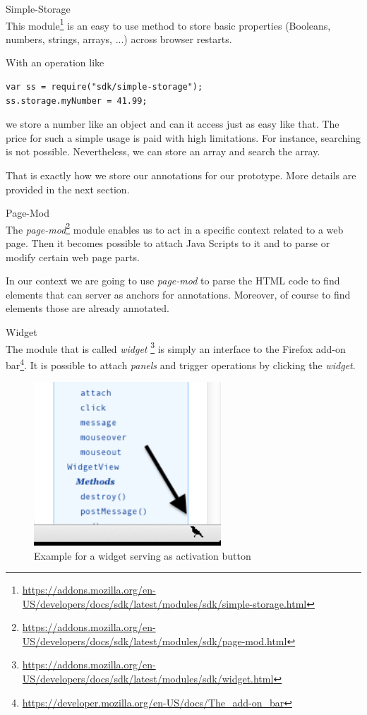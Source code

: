 \begin{description}
\item Simple-Storage\\
This module\footnote{\url{https://addons.mozilla.org/en-US/developers/docs/sdk/latest/modules/sdk/simple-storage.html}} is an easy to use method to store basic properties (Booleans, numbers, strings, arrays, ...) across browser restarts. 

With an operation like

\begin{lstlisting}
var ss = require("sdk/simple-storage");
ss.storage.myNumber = 41.99;
\end{lstlisting}

we store a number like an object and can it access just as easy like that. The price for such a simple usage is paid with high limitations. For instance, searching is not possible. Nevertheless, we can store an array and search the array. 

That is exactly how we store our annotations for our prototype. More details are provided in the next section.

\item Page-Mod\\
The \emph{page-mod}\footnote{\url{https://addons.mozilla.org/en-US/developers/docs/sdk/latest/modules/sdk/page-mod.html}} module enables us to act in a specific context related to a web page. Then it becomes possible to attach Java Scripts to it and to parse or modify certain web page parts.

In our context we are going to use \emph{page-mod} to parse the HTML code to find elements that can server as anchors for annotations. Moreover, of course to find elements those are already annotated.

\item Widget\\
The module that is called \emph{widget} \footnote{\url{https://addons.mozilla.org/en-US/developers/docs/sdk/latest/modules/sdk/widget.html}} is simply an interface to the Firefox add-on bar\footnote{\url{https://developer.mozilla.org/en-US/docs/The_add-on_bar}}. It is possible to attach \emph{panels} and trigger operations by clicking the \emph{widget}. 

\begin{figure}\centering
		\includegraphics[width=7cm]{images/example-widget.png}
		\caption{Example for a widget serving as activation button}
		\label{example-widget}
\end{figure} 


\end{description}
